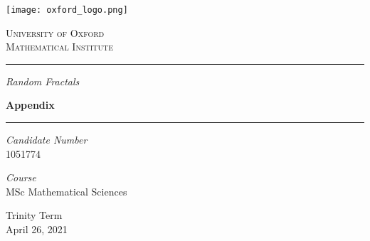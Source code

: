 \clearpage\null\newpage
\begin{titlepage}
	\newcommand{\HRule}{\rule{\linewidth}{0.5mm}}
		\begin{center}
		\texttt{[image: oxford\_logo.png]}
		\vspace*{1cm}
		
		\textsc{\LARGE University of Oxford}\\[0.75cm]
		\textsc{\LARGE Mathematical Institute}
		
		\vspace{1.5cm}
		
		\HRule
		\vspace{0.75cm}
		
		\textit{\LARGE Random Fractals}
		\vspace{0.5cm}
		
		\textbf{\huge Appendix}
		
		\vspace{0.5cm}
		\HRule
		
		\vspace{1.5cm}
		
		\begin{minipage}{0.4\textwidth}
			\begin{flushleft}
				\large
			\end{flushleft}
		\end{minipage}
		
		\begin{minipage}{0.4\textwidth}
			\begin{flushright}
				\large
			\end{flushright}
		\end{minipage}
		
		\vspace{0.5cm}
		
		\textit{Candidate Number}\\
		1051774
		
		\vspace{0.5cm}
		
		\textit{Course}\\
		MSc Mathematical Sciences
		
		\vfill
		
		{\large Trinity Term\\
			April 26, 2021}
	\end{center}
\end{titlepage}
